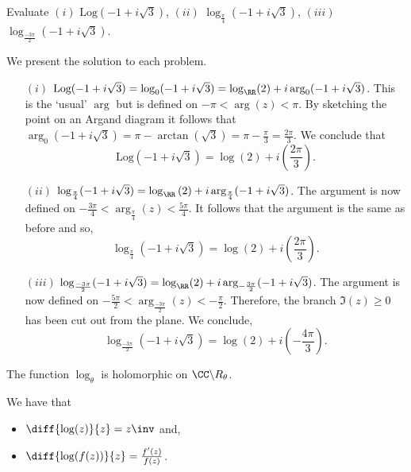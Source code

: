 \documentclass[12pt, a4paper]{article}
\begin{document}
\begin{mdexample}
    Evaluate \((i)\) \(\text{Log}(-1+i\sqrt{3})\), \((ii)\) \(\log_{\frac{\pi}{4}}(-1+i\sqrt{3})\), \((iii)\) \(\log_{\frac{-3\pi}{2}}(-1+i\sqrt{3})\).
    \begin{solution}
        We present the solution to each problem.
        \begin{enumerate}
            \item[\((i)\)] \(\text{Log}(-1+i\sqrt{3}) = \log_0(-1+i\sqrt{3}) = \log_{\RR}(2) + i \arg_0(-1+i\sqrt{3})\). This is the `usual' \(\arg\) but is defined on \(-\pi<\arg(z)<\pi\). By sketching the point on an Argand diagram it follows that \(\arg_0(-1+i\sqrt{3}) = \pi - \arctan\left( \sqrt{3} \right) = \pi - \frac{\pi}{3} = \frac{2\pi}{3}\). We conclude that 
            \[\text{Log}(-1+i\sqrt{3}) = \log(2)+ i\left( \frac{2\pi}{3} \right).\]
            \item[\((ii)\)] \(\log_{\frac{\pi}{4}}(-1+i\sqrt{3}) = \log_{\RR} \left( 2 \right) + i \arg_{\frac{\pi}{4}} (-1+i\sqrt{3})\). The argument is now defined on \(-\frac{3\pi}{4} < \arg_{\frac{\pi}{4}}(z)< \frac{5\pi}{4}\). It follows that the argument is the same as before and so,
            \[\log_{\frac{\pi}{4}}(-1+i\sqrt{3}) = \log \left( 2 \right) + i \left(  \frac{2\pi}{3} \right).\]
            \item[\((iii)\)] \(\log_{\frac{-3\pi}{2}}(-1+i\sqrt{3}) = \log_{\RR}(2)+i\arg_{-\frac{3\pi}{2}}(-1+i\sqrt{3})\). The argument is now defined on \(-\frac{5\pi}{2}<\arg_{\frac{-3\pi}{2}}(z)<-\frac{\pi}{2}\). Therefore, the branch \(\Im(z)\geq 0\) has been cut out from the plane. We conclude,
            \[\log_{\frac{-3\pi}{2}}(-1+i\sqrt{3}) = \log(2)+i\left( -\frac{4\pi}{3} \right).\]
        \end{enumerate}
    \end{solution}
\end{mdexample}

\begin{mdthm}
    The function \(\log_{\theta}\) is holomorphic on \(\CC \backslash R_{\theta}\).
\end{mdthm}

\begin{corollary}
    We have that
    \begin{itemize}
        \item \(\diff{\log(z)}{z} = z\inv\) and,
        \item \(\diff{\log(f(z))}{z} = \frac{f'(z)}{f(z)}\).
    \end{itemize}
\end{corollary}
\end{document}
